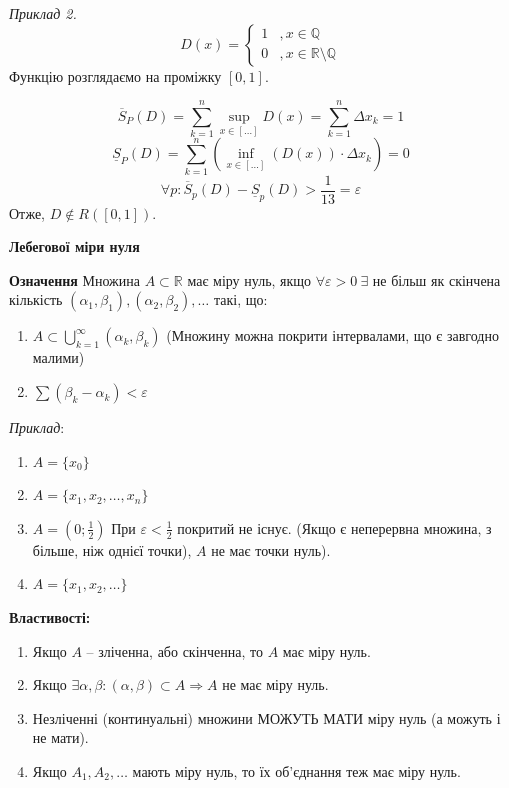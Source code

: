 \documentclass[12pt]{report}
\begin{document}
	\textit{Приклад 2.}
	$$D(x) =  \begin{cases} 1 &, x \in \mathbb{Q} \\
	0 &, x \in \mathbb{R} \setminus \mathbb{Q} \end{cases}$$
	Функцію розглядаємо на проміжку $[0,1]$.
	
	$$\overline S_{P} (D) = \sum_{k=1}^n \sup_{x \in [\ldots]} D(x) = \sum_{k=1}^n \Delta x_k = 1$$
	$$\underline S_{P} (D) = \sum_{k=1}^n( \inf_{x \in [\ldots]} (D(x)) \cdot  \Delta x_k) = 0$$
	$$\forall p : \overline S_{p}(D) - \underline S_{p} (D) > \frac{1}{13} =  \varepsilon$$
	Отже, $D \notin R([0,1])$.
	
	\begin{center}
		\textbf{ Лебегової міри нуля} 
	\end{center}
	
	\textbf{Означення} Множина $A \subset \mathbb{R}$ має міру нуль, якщо $\forall \varepsilon > 0 \ \exists$ не більш як скінчена кількість $ (\alpha_1,\beta_1), (\alpha_2,\beta_2), \ldots$ такі, що:
	
	\begin{enumerate}
		
		\item $A \subset \bigcup_{k=1}^{\infty} (\alpha_k, \beta_k)$ (Множину можна покрити інтервалами, що є завгодно малими)
		
		\item $\sum (\beta_k - \alpha_k) < \varepsilon$
		
	\end{enumerate}
	
	\textit{Приклад}:
	
	\begin{enumerate}
		
		\item $A = \{ x_0\}$
		\item $A = \{ x_1, x_2, \ldots, x_n\}$
		\item $A = (0; \frac{1}{2})$ При $\varepsilon < \frac{1}{2}$ покритий не існує. (Якщо є неперервна множина, з більше, ніж однієї точки), $A$ не має точки нуль).
		\item $A = \{ x_1, x_2, \ldots\}$
	\end{enumerate}
	
	\textbf{Властивості:}
	
	\begin{enumerate}
		
		\item Якщо $A$ -- зліченна, або скінченна, то $A$ має міру нуль.
		\item Якщо $\exists \alpha, \beta : (\alpha, \beta) \subset A \Longrightarrow A$ не має міру нуль.
		\item Незліченні (континуальні) множини МОЖУТЬ МАТИ  міру нуль (а можуть і не мати).
		\item Якщо $A_1, A_2, \ldots$ мають міру нуль, то їх об'єднання теж має міру нуль.  
		
	\end{enumerate}
	
\end{document}
